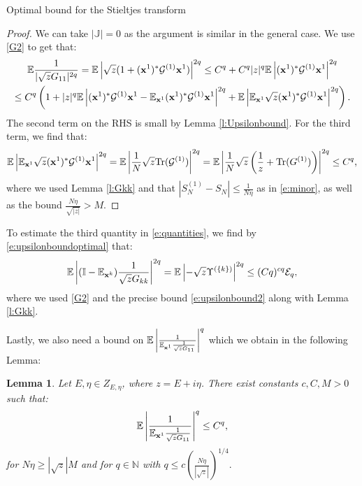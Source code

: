 \documentclass[11pt, a4paper, oneside]{book}
\numberwithin{equation}{chapter}
\newcommand{\E}{\mathbb E}
\newcommand{\xx}{{\bf x}}
\newtheorem{lem}[thm]{Lemma}
\begin{document}
\begin{section}{Optimal bound for the Stieltjes transform}
\begin{proof}
We can take $|\mathbb{J}|=0$ as the argument is similar in the general case. We use \eqref{G2} to get that:
%
\begin{multline*} \E \frac{1}{| \sqrt{z} G_{11}|^{2q } } = \E \left |\sqrt{z} (1+ (\mathbf{x}^1)^*\mathcal{G}^{(1)}\mathbf{x}^1 ) \right |^{2q} \leq C^q + C^q|z|^q \E \left | (\mathbf{x}^1)^*\mathcal{G}^{(1)}\mathbf{x}^1 \right |^{2q}
\\
\leq C^q \left (1+ |z|^q\E \left |(\mathbf{x}^1)^*\mathcal{G}^{(1)}\mathbf{x}^1  -\E_{\xx^1} (\mathbf{x}^1)^*\mathcal{G}^{(1)}\mathbf{x}^1 \right |^{2q} +\E \left | \E_{\xx^1} \sqrt{z}(\mathbf{x}^1)^*\mathcal{G}^{(1)}\mathbf{x}^1 \right |^{2q} \right ) .
\end{multline*}
%
The second term on the RHS is small by Lemma \ref{l:Upsilonbound}. For the third term, we find that:
%
\begin{equation}
\E \left | \E_{\xx^1} \sqrt{z}(\mathbf{x}^1)^*\mathcal{G}^{(1)}\mathbf{x}^1 \right |^{2q} = \E \left |\frac{1}{N} \sqrt{z} \mathrm{Tr} (\mathcal{G}^{(1)}) \right|^{2q} = \E \left | \frac{1}{N} \sqrt{z} \left ( \frac{1}{z} + \mathrm{Tr} (G^{(1)}) \right) \right |^{2q} \leq C^q ,
\end{equation}
where we used Lemma \ref{l:Gkk} and that $|S_N^{(1)} - S_{N}|\leq \frac{1}{N\eta} $ as in \eqref{e:minor}, as well as the bound $ \frac{N\eta}{\sqrt{|z|}} > M.$
\end{proof}
%
To estimate the third quantity in \eqref{e:quantities}, we find by \eqref{e:upsilonboundoptimal} that:
%
\begin{equation}\label{e:oneover}\E \left| (\mathbb{I}-\E_{\xx^k}) \frac{1}{\sqrt{z} G_{kk}}\right|^{2q} = \E \left|-\sqrt{z} \Upsilon^{(\{k\})} \right|^{2q} \leq (Cq)^{cq} \mathcal{E}_q,
\end{equation}
%
where we used \eqref{G2} and the precise bound \eqref{e:upsilonbound2} along with Lemma \ref{l:Gkk}.

\pagebreak

Lastly, we also need a bound on $\E \left | \frac{1}{\E_{\xx^1} \frac{1}{\sqrt{z} G_{11}}} \right |^q$ which we obtain in the following Lemma:

\begin{lem} \label{lem}
Let $E,\eta \in Z_{E,\eta}$, where $z =E+i\eta$. There exist constants $c,C,M>0$ such that:
%
$$ \E \left | \frac{1}{\E_{\xx^1} \frac{1}{\sqrt{z} G_{11}}} \right |^q \leq C^q ,$$
%
for $N \eta \geq |\sqrt{z}| M $ and for $q \in \mathbb{N}$ with $q\leq c \left (\frac{N\eta}{|\sqrt{z}|} \right )^{1/4} .$
\end{lem}


\end{section}
\end{document}
